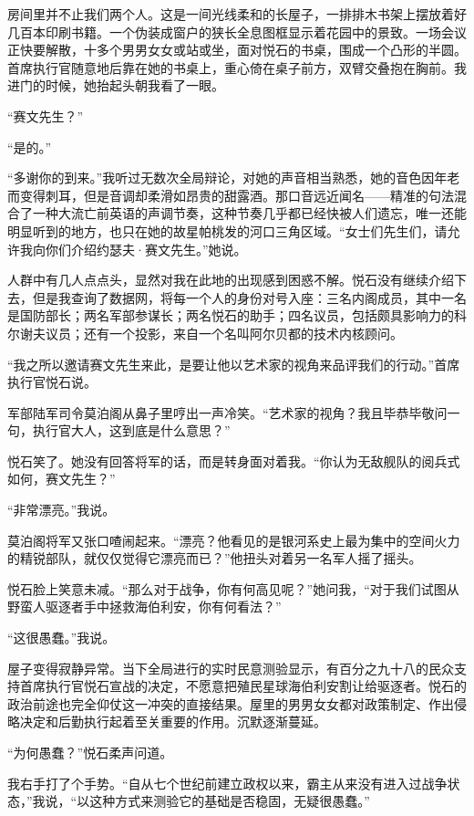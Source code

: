 \documentclass[AutoFakeBold=true]{book}
\begin{document}
房间里并不止我们两个人。这是一间光线柔和的长屋子，一排排木书架上摆放着好几百本印刷书籍。一个伪装成窗户的狭长全息图框显示着花园中的景致。一场会议正快要解散，十多个男男女女或站或坐，面对悦石的书桌，围成一个凸形的半圆。首席执行官随意地后靠在她的书桌上，重心倚在桌子前方，双臂交叠抱在胸前。我进门的时候，她抬起头朝我看了一眼。

``赛文先生？''

``是的。''

``多谢你的到来。''我听过无数次全局辩论，对她的声音相当熟悉，她的音色因年老而变得刺耳，但是音调却柔滑如昂贵的甜露酒。那口音远近闻名——精准的句法混合了一种大流亡前英语的声调节奏，这种节奏几乎都已经快被人们遗忘，唯一还能明显听到的地方，也只在她的故星帕桃发的河口三角区域。``女士们先生们，请允许我向你们介绍约瑟夫·赛文先生。''她说。

人群中有几人点点头，显然对我在此地的出现感到困惑不解。悦石没有继续介绍下去，但是我查询了数据网，将每一个人的身份对号入座：三名内阁成员，其中一名是国防部长；两名军部参谋长；两名悦石的助手；四名议员，包括颇具影响力的科尔谢夫议员；还有一个投影，来自一个名叫阿尔贝都的技术内核顾问。

``我之所以邀请赛文先生来此，是要让他以艺术家的视角来品评我们的行动。''首席执行官悦石说。

军部陆军司令莫泊阁从鼻子里哼出一声冷笑。``{\kaishu 艺术家}的视角？我且毕恭毕敬问一句，执行官大人，这到底是什么意思？''

悦石笑了。她没有回答将军的话，而是转身面对着我。``你认为无敌舰队的阅兵式如何，赛文先生？''

``非常漂亮。''我说。

莫泊阁将军又张口喳闹起来。``{\kaishu 漂亮}？他看见的是银河系史上最为集中的空间火力的精锐部队，就仅仅觉得它漂亮而已？''他扭头对着另一名军人摇了摇头。

悦石脸上笑意未减。``那么对于战争，你有何高见呢？''她问我，``对于我们试图从野蛮人驱逐者手中拯救海伯利安，你有何看法？''

``这很愚蠢。''我说。

屋子变得寂静异常。当下全局进行的实时民意测验显示，有百分之九十八的民众支持首席执行官悦石宣战的决定，不愿意把殖民星球海伯利安割让给驱逐者。悦石的政治前途也完全仰仗这一冲突的直接结果。屋里的男男女女都对政策制定、作出侵略决定和后勤执行起着至关重要的作用。沉默逐渐蔓延。

``为何愚蠢？''悦石柔声问道。

我右手打了个手势。``自从七个世纪前建立政权以来，霸主从来没有进入过战争状态，''我说，``以这种方式来测验它的基础是否稳固，无疑很愚蠢。''
\end{document}
